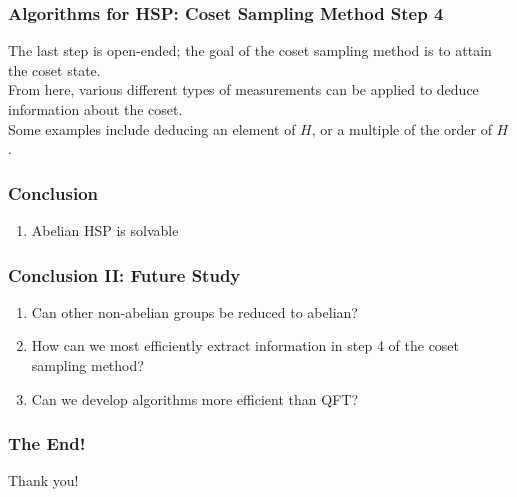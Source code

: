 \documentclass{beamer}
\begin{document}
\begin{frame}
\frametitle{Algorithms for HSP: Coset Sampling Method Step 4}
            The last step is open-ended; the goal of the coset sampling method is to attain the coset state.\\
            From here, various different types of measurements can be applied to deduce information about the coset.\\
            Some examples include deducing an element of $H$, or a multiple of the order of $H$.
\end{frame}

\begin{frame}
\frametitle{Conclusion}
    \begin{enumerate}
    \item Abelian HSP is solvable
    \end{enumerate}
\end{frame}

\begin{frame}
\frametitle{Conclusion II: Future Study}
    \begin{enumerate}
    \item Can other non-abelian groups be reduced to abelian?
    \item How can we most efficiently extract information in step 4 of the coset sampling method?
    \item Can we develop algorithms more efficient than QFT?
    \end{enumerate}
\end{frame}

\begin{frame}
\frametitle{The End!}
    Thank you!
\end{frame}

\newpage
\nocite{*}
\printbibliography
\end{document}
